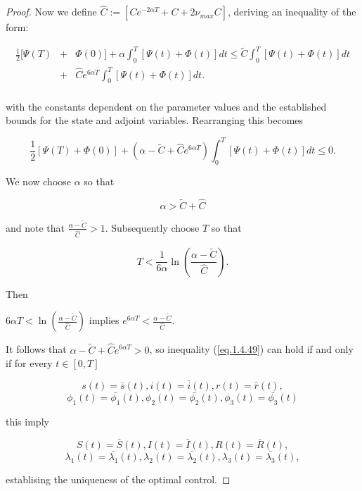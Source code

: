 \begin{proof}
Now we define $\hat{C}:=[Ce^{-2\alpha T}+C+2\nu_{max}C]$, deriving an inequality of the form:

\begin{eqnarray*}
	\frac{1}{2}[\Psi(T)&+&\Phi(0)]+\alpha\int_{0}^{T}[\Psi(t)+\Phi(t)]dt	\leq \tilde{C}\int_{0}^{T}[\Psi(t)+\Phi(t)]dt\\
	&+&\hat{C}e^{6\alpha T}\int_{0}^{T}[\Psi(t)+\Phi(t)]dt.\\	
\end{eqnarray*}

with the constants dependent on the parameter values and the established bounds for the state and adjoint variables. Rearranging this becomes

\begin{equation}\label{eq.1.4.49}
\frac{1}{2}[\Psi(T)+\Phi(0)]+(\alpha-\tilde{C}+\hat{C}e^{6\alpha T})\int_{0}^{T}[\Psi(t)+\Phi(t)]dt\leq 0.
\end{equation}

We now choose $\alpha$ so that 

$$\alpha>\tilde{C}+\hat{C}$$

and note that $\frac{\alpha-\tilde{C}}{\hat{C}}>1$. Subsequently choose $T$ so that 

$$T<\frac{1}{6\alpha}\ln\left(\frac{\alpha-\tilde{C}}{\hat{C}}\right).$$

Then

$6\alpha T<\ln\left(\frac{\alpha-\tilde{C}}{\hat{C}}\right)$ implies $e^{6\alpha T}<\frac{\alpha-\tilde{C}}{\hat{C}}$.

It follows that $\alpha-\tilde{C}+\hat{C}e^{6\alpha T}>0$, so inequality (\ref{eq.1.4.49}) can hold if and only if for every $t\in [0,T]$

$$s(t)=\bar{s}(t),i(t)=\bar{i}(t),r(t)=\bar{r}(t),$$
$$\phi_1(t)=\bar{\phi_1}(t),\phi_2(t)=\bar{\phi_2}(t),\phi_3(t)=\bar{\phi_3}(t)$$

this imply

$$S(t)=\bar{S}(t),I(t)=\bar{I}(t),R(t)=\bar{R}(t),$$
$$\lambda_1(t)=\bar{\lambda_1}(t),\lambda_2(t)=\bar{\lambda_2}(t),\lambda_3(t)=\bar{\lambda_3}(t),$$

establising the uniqueness of the optimal control.
\end{proof}
